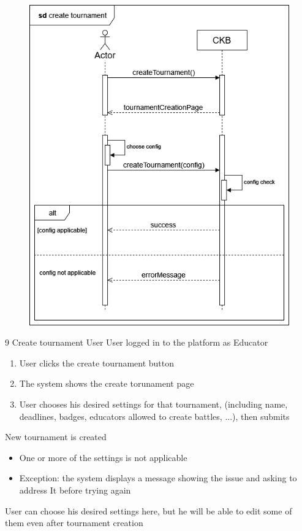 \usecase
{
    \begin{figure}[H]
        \centering
        \includegraphics[width=\textwidth]{src/sequence_diagrams/createtourn.png}
    \end{figure}
}
{9}
{Create tournament} %
{User} %
{User logged in to the platform as Educator} %
{ %
    \begin{enumerate}
        \item User clicks the create tournament button
        \item The system shows the create torunament page
        \item User chooses his desired settings for that tournament, (including name, deadlines, badges, educators allowed to create battles, ...), then submits
    \end{enumerate}
}
{New tournament is created} %
{ %
    \begin{itemize}
        \item One or more of the settings is not applicable
    \end{itemize}
}
{ %
    \begin{itemize}
        \item Exception: the system displays a message showing the issue and asking to address It before trying again
    \end{itemize}
    User can choose his desired settings here, but he will be able to edit some of them even after tournament creation
}

